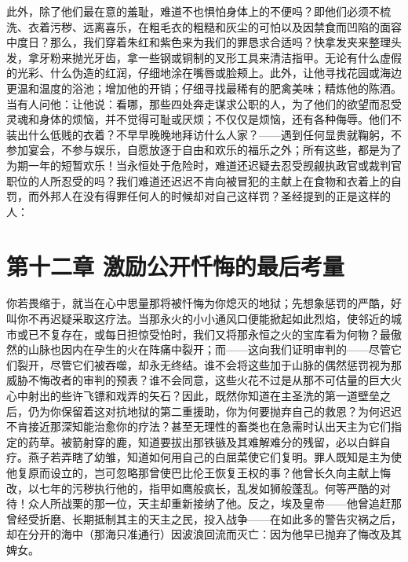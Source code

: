 此外，除了他们最在意的羞耻，难道不也惧怕身体上的不便吗？即他们必须不梳洗、衣着污秽、远离喜乐，在粗毛衣的粗糙和灰尘的可怕以及因禁食而凹陷的面容中度日？那么，我们穿着朱红和紫色来为我们的罪恳求合适吗？快拿发夹来整理头发，拿牙粉来抛光牙齿，拿一些钢或铜制的叉形工具来清洁指甲。无论有什么虚假的光彩、什么伪造的红润，仔细地涂在嘴唇或脸颊上。此外，让他寻找花园或海边更温和温度的浴池；增加他的开销；仔细寻找最稀有的肥禽美味；精炼他的陈酒。当有人问他：让他说：看哪，那些四处奔走谋求公职的人，为了他们的欲望而忍受灵魂和身体的烦恼，并不觉得可耻或厌烦；不仅仅是烦恼，还有各种侮辱。他们不装出什么低贱的衣着？不早早晚晚地拜访什么人家？——遇到任何显贵就鞠躬，不参加宴会，不参与娱乐，自愿放逐于自由和欢乐的福乐之外；所有这些，都是为了为期一年的短暂欢乐！当永恒处于危险时，难道还迟疑去忍受觊觎执政官或裁判官职位的人所忍受的吗？我们难道还迟迟不肯向被冒犯的主献上在食物和衣着上的自罚，而外邦人在没有得罪任何人的时候却对自己这样罚？圣经提到的正是这样的人：\par


\section{第十二章 激励公开忏悔的最后考量}

你若畏缩于，就当在心中思量那将被忏悔为你熄灭的地狱；先想象惩罚的严酷，好叫你不再迟疑采取这疗法。当那永火的小小通风口便能掀起如此烈焰，使邻近的城市或已不复存在，或每日担惊受怕时，我们又将那永恒之火的宝库看为何物？最傲然的山脉也因内在孕生的火在阵痛中裂开；而——这向我们证明审判的——尽管它们裂开，尽管它们被吞噬，却永无终结。谁不会将这些加于山脉的偶然惩罚视为那威胁不悔改者的审判的预表？谁不会同意，这些火花不过是从那不可估量的巨大火心中射出的些许飞镖和戏弄的矢石？因此，既然你知道在主圣洗的第一道壁垒之后，仍为你保留着这对抗地狱的第二重援助，你为何要抛弃自己的救恩？为何迟迟不肯接近那深知能治愈你的疗法？甚至无理性的畜类也在急需时认出天主为它们指定的药草。被箭射穿的鹿，知道要拔出那铁镞及其难解难分的残留，必以白鲜自疗。燕子若弄瞎了幼雏，知道如何用自己的白屈菜使它们复明。罪人既知是主为使他复原而设立的，岂可忽略那曾使巴比伦王恢复王权的事？他曾长久向主献上悔改，以七年的污秽执行他的，指甲如鹰般疯长，乱发如狮般蓬乱。何等严酷的对待！众人所战栗的那一位，天主却重新接纳了他。反之，埃及皇帝——他曾追赶那曾经受折磨、长期抵制其主的天主之民，投入战争——在如此多的警告灾祸之后，却在分开的海中（那海只准通行）因波浪回流而灭亡：因为他早已抛弃了悔改及其婢女。\par

